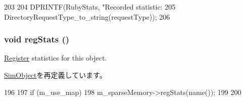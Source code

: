\begin{DoxyCode}
203                                                                    {
204     DPRINTF(RubyStats, "Recorded statistic: %
205             DirectoryRequestType_to_string(requestType));
206 }
\end{DoxyCode}
\hypertarget{classDirectoryMemory_a4dc637449366fcdfc4e764cdf12d9b11}{
\subsubsection[{regStats}]{\setlength{\rightskip}{0pt plus 5cm}void regStats ()}}
\label{classDirectoryMemory_a4dc637449366fcdfc4e764cdf12d9b11}
\hyperlink{classRegister}{Register} statistics for this object. 

\hyperlink{classSimObject_a4dc637449366fcdfc4e764cdf12d9b11}{SimObject}を再定義しています。


\begin{DoxyCode}
196 {
197     if (m_use_map) {
198         m_sparseMemory->regStats(name());
199     }
200 }
\end{DoxyCode}


